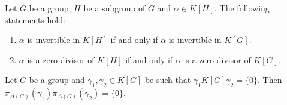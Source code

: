 \begin{exercise}
	Let $G$ be a group, $H$ be a subgroup of $G$ and $\alpha\in K[H]$. The following statements hold:
	\begin{enumerate}
		\item $\alpha$ is invertible in $K[H]$ if and only if $\alpha$ is
			invertible in $K[G]$.
		\item $\alpha$ is a zero divisor of $K[H]$ if and only if $\alpha$ is  
			a zero divisor of $K[G]$.
	\end{enumerate}
\end{exercise}

	

\begin{lemma}[Passman]
	\label{lem:Passman}
	Let $G$ be a group and 
	$\gamma_1,\gamma_2\in K[G]$ be such that $\gamma_1K[G]\gamma_2=\{0\}$.
	Then $\pi_{\Delta(G)}(\gamma_1)\pi_{\Delta(G)}(\gamma_2)=\{0\}$.
\end{lemma}


